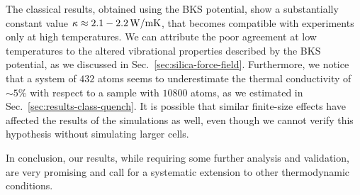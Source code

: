 The classical results, obtained using the BKS potential, show a substantially constant value $\kappa\approx 2.1-2.2\,\mathrm{W/mK}$, that becomes compatible with experiments only at high temperatures. 
We can attribute the poor agreement at low temperatures to the altered vibrational properties described by the BKS potential, as we discussed in Sec.~\ref{sec:silica-force-field}. 
Furthermore, we notice that a system of $432$ atoms seems to underestimate the thermal conductivity of $\sim 5\%$ with respect to a sample with $10800$ atoms, as we estimated in Sec.~\ref{sec:results-class-quench}. 
It is possible that similar finite-size effects have affected the results of the \abinitio simulations as well, even though we cannot verify this hypothesis without simulating larger cells. 

In conclusion, our \abinitio results, while requiring some further analysis and validation, are very promising and call for a systematic extension to other thermodynamic conditions. 









